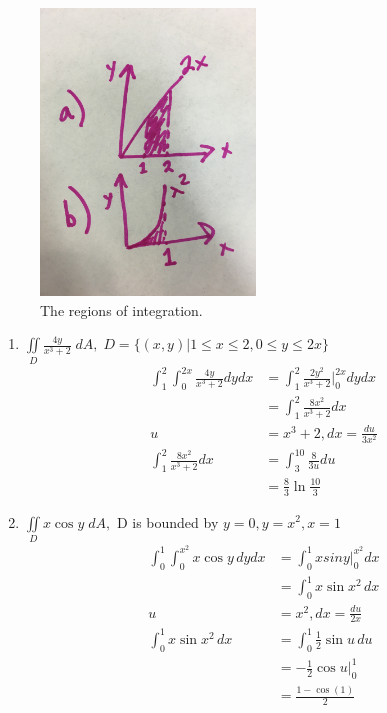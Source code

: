 \documentclass{article}
\begin{document}
\begin{figure}[H]
    \centering
    \includegraphics[height=3in]{regions.jpg}
    \caption{The regions of integration.}
\end{figure}

\begin{enumerate}
    \item $\iint\limits_D  \frac{4y}{x^3+2} \; dA, \; D = \{(x,y) | 1 \le x \le 2, 0 \le y \le 2x\} $
    \begin{align*}
        \int_1^2 \int_0^{2x} \frac{4y}{x^3 + 2} dy dx &= \int_1^2 \frac{2y^2}{x^3 + 2}\Bigr|_{0}^{2x} dy dx \\
        &= \int_1^2 \frac{8x^2}{x^3 + 2}dx \\
        u &= x^3 + 2, dx = \frac{du}{3x^2} \\
        \int_1^2 \frac{8x^2}{x^3 + 2}dx  &= \int_3^{10} \frac{8}{3u}du \\
        &= \frac{8}{3} \ln \frac{10}{3}
    \end{align*}
    \item $\iint\limits_D x \cos y \; dA, $ \; D is bounded by $y=0, y = x^2, x = 1$
    \begin{align*}
        \int_0^1 \int_0^{x^2} x \cos y \, dy dx &= \int_0^1 xsiny \Bigr|_{0}^{x^2} dx \\
        &= \int_0^1 x \sin x^2 \, dx \\
        u &= x^2, dx = \frac{du}{2x} \\
        \int_0^1 x \sin x^2 \, dx &= \int_0^1 \frac{1}{2} \sin u \, du \\
        &= -\frac{1}{2}  \cos u \Bigr|_{0}^{1} \\
        &= \frac{1-\cos (1)}{2}
    \end{align*}
\end{enumerate}
\end{document}
